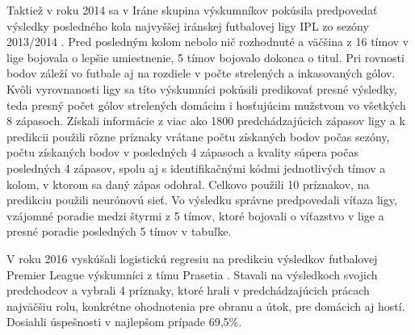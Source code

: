 Taktiež v roku 2014 sa v Iráne skupina výskumníkov pokúsila predpovedať výsledky posledného kola najvyššej iránskej futbalovej ligy IPL zo sezóny 2013/2014 \citep{related:iran}.
Pred posledným kolom nebolo nič rozhodnuté a väčšina z 16 tímov v lige bojovala o lepšie umiestnenie, 5 tímov bojovalo dokonca o titul.
Pri rovnosti bodov záleží vo futbale aj na rozdiele v počte strelených a inkasovaných gólov. 
Kvôli vyrovnanosti ligy sa títo výskumníci pokúsili predikovať presné výsledky, teda presný počet gólov strelených domácim i hosťujúcim mužstvom vo všetkých 8 zápasoch.
Získali informácie z viac ako 1800 predchádzajúcich zápasov ligy a k predikcii použili rôzne príznaky vrátane počtu získaných bodov počas sezóny, počtu získaných bodov v posledných 4 zápasoch a kvality súpera počas posledných 4 zápasov, spolu aj s identifikačnými kódmi jednotlivých tímov a kolom, v ktorom sa daný zápas odohral.
Celkovo použili 10 príznakov, na predikciu použili neurónovú sieť.
Vo výsledku správne predpovedali víťaza ligy, vzájomné poradie medzi štyrmi z 5 tímov, ktoré bojovali o víťazstvo v lige a presné poradie posledných 5 tímov v tabuľke.

V roku 2016 vyskúšali logistickú regresiu na predikciu výsledkov futbalovej Premier League výskumníci z tímu Prasetia \citep{related:prasetio}. 
Stavali na výsledkoch svojich predchodcov a vybrali 4 príznaky, ktoré hrali v predchádzajúcich prácach najväčšiu rolu, konkrétne ohodnotenia pre obranu a útok, pre domácich aj hostí.
Dosiahli úspešnosti v najlepšom prípade 69,5\%.